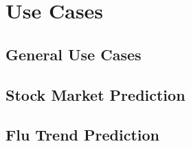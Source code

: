 
\chapter{Use Cases}
\label{cha:use-cases}

\section{General Use Cases}
\label{sec:general-use-cases}


\section{Stock Market Prediction}
\label{sec:stock-market-prediction}


\section{Flu Trend Prediction}
\label{sec:flu-trend-prediction}
